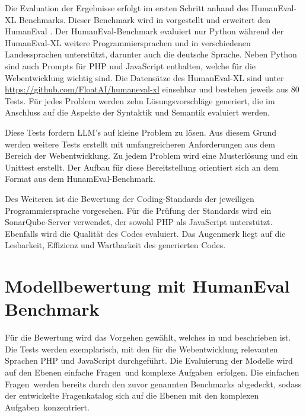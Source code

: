 Die Evaluation der Ergebnisse erfolgt im ersten Schritt anhand des HumanEval-XL Benchmarks. Dieser Benchmark wird in \cite{peng-2024} vorgestellt und erweitert den HumanEval \cite{chen-2021}. Der HumanEval-Benchmark evaluiert nur Python während der HumanEval-XL weitere Programmiersprachen und in verschiedenen Landessprachen unterstützt, darunter auch die deutsche Sprache. Neben Python sind auch Prompts für PHP und JavaScript enthalten, welche für die Webentwicklung wichtig sind. Die Datensätze des HumanEval-XL sind unter \href{https://github.com/FloatAI/humaneval-xl}{https://github.com/FloatAI/humaneval-xl} einsehbar und bestehen jeweils aus 80 Tests. Für jedes Problem werden zehn Lösungsvorschläge generiert, die im Anschluss auf die Aspekte der Syntaktik und Semantik evaluiert werden.\vspace{0.2cm}

Diese Tests fordern LLM's auf kleine Problem zu lösen. Aus diesem Grund werden weitere Tests erstellt mit umfangreicheren Anforderungen aus dem Bereich der Webentwicklung. Zu jedem Problem wird eine Musterlösung und ein Unittest erstellt. Der Aufbau für diese Bereitstellung orientiert sich an dem Format aus dem HunamEval-Benchmark.\vspace{0.2cm}

Des Weiteren ist die Bewertung der Coding-Standards der jeweiligen Programmiersprache vorgesehen. Für die Prüfung der Standards wird ein SonarQube-Server verwendet, der sowohl PHP als JavaScript unterstützt. Ebenfalls wird die Qualität des Codes evaluiert. Das Augenmerk liegt auf die Lesbarkeit, Effizienz und Wartbarkeit des generierten Codes.\vspace{0.2cm}



\section{Modellbewertung mit HumanEval Benchmark}
Für die Bewertung wird das Vorgehen gewählt, welches in \cite{chen-2021} und \cite{peng-2024} beschrieben ist. Die Tests werden exemplarisch, mit den für die Webentwicklung relevanten Sprachen PHP und JavaScript durchgeführt. Die Evaluierung der Modelle wird auf den Ebenen \glqq einfache Fragen\grqq \ und \glqq komplexe Aufgaben\grqq \ erfolgen. Die \glqq einfachen Fragen\grqq \ werden bereits durch den zuvor genannten Benchmarks abgedeckt, sodass der entwickelte Fragenkatalog sich auf die Ebenen mit den \glqq komplexen Aufgaben\grqq \ konzentriert.\vspace{0.2cm}


